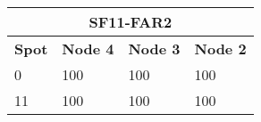 \begin{tabular}{|l|l|l|l|}
\multicolumn{4}{c}{\textbf{SF11-FAR2}} \\ \hline 
\textbf{Spot} & \textbf{Node 4} & \textbf{Node 3} & \textbf{Node 2} \\ \hline
0 & 100 & 100 & 100 \\ \hline
11 & 100 & 100 & 100 \\ \hline
\end{tabular}
